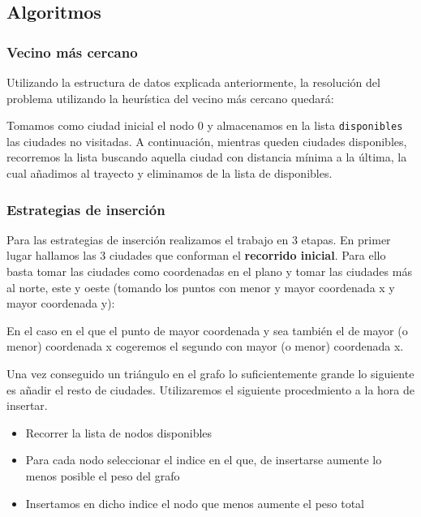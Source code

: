 \subsection{Algoritmos}

\subsubsection{Vecino más cercano}

Utilizando la estructura de datos explicada anteriormente, la resolución del problema
utilizando la heurística del vecino más cercano quedará:



Tomamos como ciudad inicial el nodo 0 y almacenamos en la lista \texttt{disponibles}
las ciudades no visitadas. A continuación, mientras queden ciudades disponibles,
recorremos la lista buscando aquella ciudad con distancia mínima a la última, la
cual añadimos al trayecto y eliminamos de la lista de disponibles.

\subsubsection{Estrategias de inserción}

Para las estrategias de inserción realizamos el trabajo en 3 etapas.
En primer lugar hallamos las 3 ciudades que conforman el \textbf{recorrido inicial}.
Para ello basta tomar las ciudades como coordenadas en el plano y tomar las ciudades
más al norte, este y oeste (tomando los puntos con menor y mayor coordenada x y mayor
coordenada y):



En el caso en el que el punto de mayor coordenada y sea también el de mayor (o menor)
coordenada x cogeremos el segundo con mayor (o menor) coordenada x.


Una vez conseguido un triángulo en el grafo lo suficientemente grande lo siguiente es añadir el resto de ciudades. Utilizaremos el siguiente procedmiento a la hora de insertar.

\begin{itemize}
	\item{Recorrer la lista de nodos disponibles} 
	\item{Para cada nodo seleccionar el indice en el que, de insertarse aumente lo menos posible el peso del grafo}
	\item{Insertamos en dicho indice el nodo que menos aumente el peso total}
\end{itemize}

